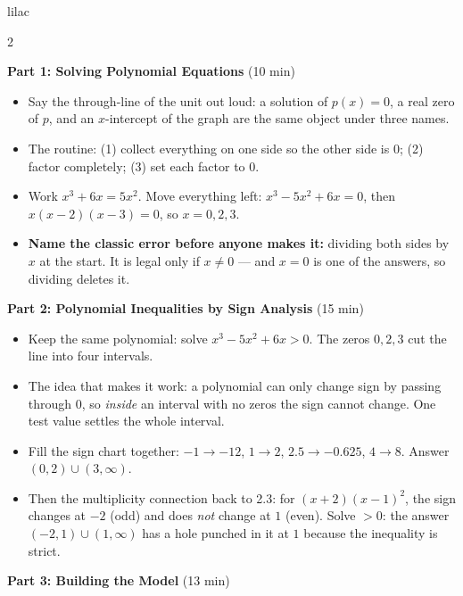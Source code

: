 \documentclass[10pt]{article}
\begin{document}
\begin{skillbox}[Lesson]{lilac}
\begin{multicols}{2}

\textbf{Part 1: Solving Polynomial Equations} (10 min)

\begin{itemize}
  \item Say the through-line of the unit out loud: a solution of $p(x) = 0$,
        a real zero of $p$, and an $x$-intercept of the graph are the same
        object under three names.
  \item The routine: (1) collect everything on one side so the other side is
        $0$; (2) factor completely; (3) set each factor to $0$.
  \item Work $x^3 + 6x = 5x^2$. Move everything left:
        $x^3 - 5x^2 + 6x = 0$, then $x(x-2)(x-3) = 0$, so $x = 0, 2, 3$.
  \item \textbf{Name the classic error before anyone makes it:} dividing both
        sides by $x$ at the start. It is legal only if $x \ne 0$ --- and
        $x = 0$ is one of the answers, so dividing deletes it.
\end{itemize}

\textbf{Part 2: Polynomial Inequalities by Sign Analysis} (15 min)

\begin{itemize}
  \item Keep the same polynomial: solve $x^3 - 5x^2 + 6x > 0$. The zeros
        $0, 2, 3$ cut the line into four intervals.
  \item The idea that makes it work: a polynomial can only change sign by
        passing through $0$, so \textit{inside} an interval with no zeros the
        sign cannot change. One test value settles the whole interval.
  \item Fill the sign chart together: $-1 \to -12$, $1 \to 2$,
        $2.5 \to -0.625$, $4 \to 8$. Answer $(0,2) \cup (3,\infty)$.
  \item Then the multiplicity connection back to 2.3: for
        $(x+2)(x-1)^2$, the sign changes at $-2$ (odd) and does \textit{not}
        change at $1$ (even). Solve $> 0$: the answer
        $(-2,1) \cup (1,\infty)$ has a hole punched in it at $1$ because the
        inequality is strict.
\end{itemize}

\columnbreak

\textbf{Part 3: Building the Model} (13 min)


\end{multicols}
\end{skillbox}
\end{document}
